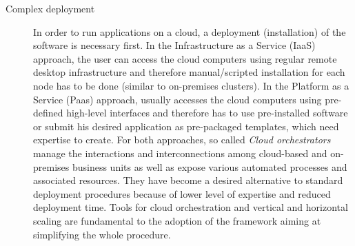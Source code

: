 \documentclass[3p,times]{elsarticle}
\begin{document}
\begin{description}
\item[Complex deployment] In order to run applications on a cloud, a deployment (installation) of the software is necessary first. In the Infrastructure as a Service (IaaS) approach, the user can access the cloud computers using regular remote desktop infrastructure and therefore manual/scripted installation for each node has to be done (similar to on-premises clusters). In the Platform as a Service (Paas) approach, usually accesses the cloud computers using pre-defined high-level interfaces and therefore has to use pre-installed software or submit his desired application as pre-packaged templates, which need expertise to create. For both approaches, so called \textit{Cloud orchestrators} manage the interactions and interconnections among cloud-based and on-premises business units as well as expose various automated processes and associated resources. They have become a desired alternative to standard deployment procedures because of lower level of expertise and reduced deployment time. Tools for cloud orchestration and vertical and horizontal scaling are fundamental to the adoption of the framework aiming at simplifying the whole procedure.


\end{description}
\end{document}
